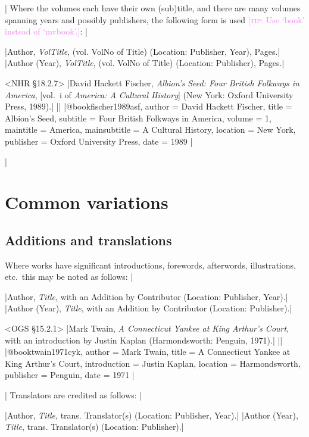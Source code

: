 \documentclass[extrafontsizes,11pt,a4paper,oneside]{memoir}
\newcommand*{\lit}[1]{\textsf{#1}}
\newcommand*{\code}[1]{`\textsf{#1}'}
\newcommand*{\aside}[1]{\textcolor{violet}{[\textsc{tip:} #1]}}
\begin{document}
\todoc|
Where the volumes each have their own (sub)title,
and there are many volumes spanning years and possibly publishers,
the following form is used \aside{Use \code{book} instead of \code{mvbook}.}:
|

\specs
|Author, \emph{VolTitle}, (\lit{vol.} VolNo \lit{of} Title) (Location: Publisher, Year), Pages.|%
|Author (Year), \emph{VolTitle}, (\lit{vol.} VolNo \lit{of} Title) (Location: Publisher), Pages.|

\bibexample<NHR \S18.2.7>
|David Hackett Fischer, \emph{Albion’s Seed: Four British Folkways in America}, [vol.\ i of \emph{America: A Cultural History}] (New York: Oxford University Press, 1989).|%
||%
|@book{fischer1989asf,
  author = {David Hackett Fischer},
  title = {Albion’s Seed},
  subtitle = {Four British Folkways in America},
  volume = {1},
  maintitle = {America},
  mainsubtitle = {A Cultural History},
  location = {New York},
  publisher = {Oxford University Press},
  date = {1989}
}|

\todoc|
\section{Common variations}

\subsection{Additions and translations}

Where works have significant introductions, forewords, afterwords, illustrations, etc.\ this may be noted as follows:
|

\specs
|Author, \emph{Title}, \lit{with an} Addition \lit{by} Contributor (Location: Publisher, Year).|%
|Author (Year), \emph{Title}, \lit{with an} Addition \lit{by} Contributor (Location: Publisher).|

\bibexample<OGS \S15.2.1>
|Mark Twain, \emph{A Connecticut Yankee at King Arthur's Court}, with an introduction by Justin Kaplan (Harmondsworth: Penguin, 1971).|%
||%
|@book{twain1971cyk,
  author = {Mark Twain},
  title = {A {Connecticut} Yankee at {King} {Arthur's} Court},
  introduction = {Justin Kaplan},
  location = {Harmondsworth},
  publisher = {Penguin},
  date = {1971}
}|

\todoc|
Translators are credited as follows:
|

\specs
|Author, \emph{Title}, \lit{trans.} Translator(s) (Location: Publisher, Year).|%
|Author (Year), \emph{Title}, \lit{trans.} Translator(s) (Location: Publisher).|
\end{document}
